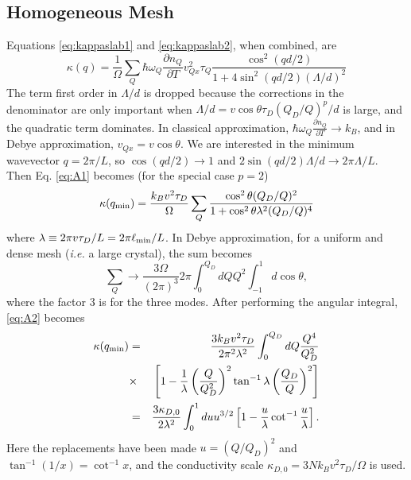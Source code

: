 \documentclass[aps,prb,twocolumn,showpacs,superscriptaddress]{revtex4-1}\begin{tiny}\end{tiny}
\begin{document}
{\begin{appendix}
\section{Homogeneous Mesh}
%
%
Equations \ref{eq:kappaslab1} and \ref{eq:kappaslab2}, when combined, are
%
\begin{equation}
\kappa(q)=\frac{1}{\Omega}\sum_Q \hbar\omega_Q\frac{\partial n_Q}{\partial T} 
v_{Qx}^2 \tau_Q \frac{\cos^2(qd/2)}{  1 +4\sin^2 (qd/2) ( \Lambda /d )^2  }
\label{eq:A1}
\end{equation}
%
The term first order in $\Lambda/d$ is dropped because the corrections in the denominator
are only important when $\Lambda/d = v\cos\theta\tau_D(Q_D/Q)^p /d$ is large, and the
quadratic term dominates.  
In classical approximation, $ \hbar\omega_Q\frac{\partial n_Q}{\partial T} \rightarrow k_B$,
and in Debye approximation, $v_{Qx} = v\cos\theta$.  We are interested in the minimum 
wavevector $q=2\pi/L$, so $\cos(qd/2)\rightarrow 1$ and $2\sin(qd/2) \Lambda/d \rightarrow 2\pi\Lambda/L$.
Then Eq. \ref{eq:A1} becomes (for the special case $p=2$)
%
\begin{equation}
\kappa(q_{\rm min})= \frac{k_B v^2 \tau_D} {\Omega}   \sum_Q 
 \frac{ \cos^2 \theta (Q_D/Q)^2 } {  1 + \cos^2 \theta \lambda^2 (Q_D/Q)^4  }
\label{eq:A2}
\end{equation}
%
where $\lambda\equiv 2\pi v\tau_D /L=2\pi\ell_{\rm min}/L$.  In Debye approximation, for a
uniform and dense mesh ({\it i.e.} a large crystal), the sum becomes
%
\begin{equation}
\sum_Q \rightarrow \frac{3\Omega}{(2\pi)^3} 2\pi\int_0^{Q_D} dQ Q^2 \int_{-1}^1 d\cos\theta,
\label{eq:A3}
\end{equation}
%
where the factor 3 is for the three modes.  After performing the angular integral, \ref{eq:A2} becomes
%
\begin{eqnarray}
\kappa(q_{\rm min})&=& \frac{3k_B v^2 \tau_D} {2\pi^2 \lambda^2}  \int_0^{Q_D} dQ
\frac{Q^4}{Q_D^2} \nonumber \\
&\times& \left[ 1-\frac{1}{\lambda}\left( \frac{Q}{Q_D^2} \right)^2
\tan^{-1}\lambda\left( \frac{Q_D}{Q} \right)^2  \right] \nonumber \\
&=& \frac{3\kappa_{D,0}}{2\lambda^2}\int_0^1 du u^{3/2}
\left[ 1-\frac{u}{\lambda} \cot^{-1}\frac{u}{\lambda} \right].
\label{eq:A4}
\end{eqnarray}
%
Here the replacements have been made $u=(Q/Q_D)^2$ and $\tan^{-1}(1/x)=\cot^{-1}x$,
and the conductivity scale $\kappa_{D,0}=3Nk_B v^2 \tau_D/\Omega$ is used.


\end{appendix}}
\end{document}
